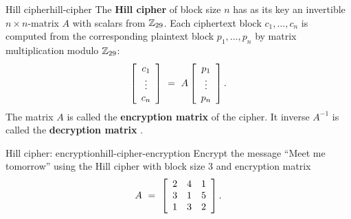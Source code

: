 \documentclass{ximera}
\begin{document}
\begin{definition}{Hill cipher}{hill-cipher}
  The \textbf{Hill cipher}%
   of block size $n$ has as its key an
  invertible $n\times n$-matrix $A$ with scalars from $\Z_{29}$. Each
  ciphertext block $c_1,\ldots,c_n$ is computed from the corresponding
  plaintext block $p_1,\ldots,p_n$ by matrix multiplication modulo
  $\Z_{29}$:
  \begin{equation*}
    \startmat{c}c_1\\\vdots\\c_n\stopmat
    ~=~ A\startmat{c}p_1\\\vdots\\p_n\stopmat.
  \end{equation*}
  The matrix $A$ is called the \textbf{encryption matrix}%
   of the cipher. It inverse $A^{-1}$ is
  called the \textbf{decryption matrix}%
  .
\end{definition}

\begin{example}{Hill cipher: encryption}{hill-cipher-encryption}
  Encrypt the message ``Meet me tomorrow'' using the Hill cipher with
  block size $3$ and encryption matrix
  \begin{equation*}
    A ~=~ \startmat{ccc}
      2 & 4 & 1 \\
      3 & 1 & 5 \\
      1 & 3 & 2 \\
    \stopmat.
  \end{equation*}
\end{example}
\end{document}
